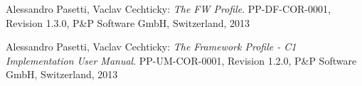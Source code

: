 \documentclass[a4paper,10pt]{article}
\begin{document}
\newpage

\begin{thebibliography}{6}
 
 Alessandro Pasetti, Vaclav Cechticky:
            {\sl The FW Profile}. PP-DF-COR-0001, Revision 1.3.0,
            P\&P Software GmbH, Switzerland, 2013
 
 Alessandro Pasetti, Vaclav Cechticky:
            {\sl The Framework Profile - C1 Implementation User Manual}. PP-UM-COR-0001, 
            Revision 1.2.0,
            P\&P Software GmbH, Switzerland, 2013
 
\end{thebibliography}
\end{document}

